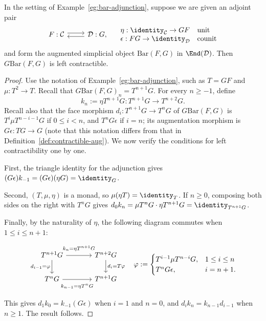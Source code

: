 \begin{proposition}\label{prop:bar-contractible}
	In the setting of Example~\ref{eg:bar-adjunction}, suppose we are given an
	adjoint pair
	\[\begin{tikzcd}
		F : \mathcal{C} \arrow[shift left, r] & \mathcal{D}: G \arrow[shift left, l] ,
	\end{tikzcd} \quad \begin{array}{ll}
		\eta: \identity_{\mathcal{C}} \to GF & \text{unit} \\
		\epsilon: FG \to \identity_{\mathcal{D}} & \text{counit}
	\end{array}\]
	and form the augmented simplicial object $\mathrm{Bar}(F,G)$ in
	$\End(\mathcal{D})$. Then $G\mathrm{Bar}(F,G)$ is left contractible.
\end{proposition}
\begin{proof}
	Use the notation of Example~\ref{eg:bar-adjunction}, such as $T=GF$ and
	$\mu:T^2\to T$. Recall that
	$G\mathrm{Bar}(F,G)_n=T^{n+1}G$. For every $n\geq-1$, define
	\[ k_n := \eta T^{n+1}G: T^{n+1}G \to T^{n+2}G . \]
	Recall also that the face morphism $d_i:T^{n+1}G\to T^nG$ of
	$G\mathrm{Bar}(F,G)$ is $T^i\mu T^{n-i-1}G$ if $0\leq i<n$, and
	$T^nG\epsilon$ if $i=n$; its augmentation morphism is
	$G\epsilon:TG\to G$ (note that this notation differs from that in
	Definition~\ref{def:contractible-aug}). We now verify the conditions for
	left contractibility one by one.

	First, the triangle identity for the adjunction gives
	$(G\epsilon)k_{-1}=(G\epsilon)(\eta G)=\identity_G$.

	Second, $(T,\mu,\eta)$ is a monad, so
	$\mu(\eta T)=\identity_T$. If $n\geq0$, composing both sides on the right
	with $T^nG$ gives
	$d_0k_n=\mu T^nG\cdot\eta T^{n+1}G=\identity_{T^{n+1}G}$.

	Finally, by the naturality of $\eta$, the following diagram commutes when
	$1\leq i\leq n+1$:
	\[\begin{tikzcd}[column sep=large]
		T^{n+1} G \arrow[r, "{k_n = \eta T^{n+1}G}" inner sep=0.6em] \arrow[d, "{d_{i-1} = \varphi}"'] & T^{n+2}G \arrow[d, "{d_i = T\varphi}"] \\
		T^n G \arrow[r, "{k_{n-1} = \eta T^n G}"' inner sep=0.6em] & T^{n+1} G
	\end{tikzcd} \quad
		\varphi := \begin{cases}
			T^{i-1} \mu T^{n-i} G, & 1 \leq i \leq n \\
			T^n G\epsilon, & i = n+1.
		\end{cases}\]
	This gives $d_1k_0=k_{-1}(G\epsilon)$ when $i=1$ and $n=0$, and
	$d_ik_n=k_{n-1}d_{i-1}$ when $n\geq1$. The result follows.
\end{proof}

